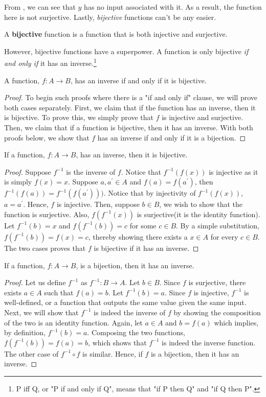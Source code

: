 From , we can see that \(y\) has no input associated with it. As a result, the function here is not surjective. Lastly, \emph{bijective} functions can't be any easier.
\begin{definition}
  A \textbf{bijective} function is a function that is both injective and surjective. 
\end{definition}


However, bijective functions have a superpower. A function is only bijective \textit{if and only if} it has an inverse.\footnote{P iff Q, or "P if and only if Q", means that "if P then Q" and "if Q then P".}
\begin{theorem}
  A function, \(f:A \to B\), has an inverse if and only if it is bijective.
\end{theorem}
\begin{proof}
  To begin such proofs where there is a "if and only if" clause, we will prove both cases separately. First, we claim that if the function has an inverse, then it is bijective. To prove this, we simply prove that \(f\) is injective and surjective. Then, we claim that if a function is bijective, then it has an inverse. With both proofs below, we show that \(f\) has an inverse if and only if it is a bijection.
\end{proof}
\begin{lemma}
  If a function, \(f: A \to B\), has an inverse, then it is bijective. 
  \label{inversebiject}
\end{lemma}
\begin{proof}
  Suppose \(f^{-1}\) is the inverse of \(f\). Notice that \(f^{-1}(f(x))\) is injective as it is simply \(f(x)=x\). Suppose \(a, a^\prime \in A\) and \(f(a)=f(a^\prime)\), then \(f^{-1}(f(a))=f^{-1}(f(a^\prime)))\). Notice that by injectivity of \(f^{-1}(f(x))\), \(a=a^\prime\). Hence, \(f\) is injective. Then, suppose \(b \in B\), we wish to show that the function is surjective. Also, \(f(f^{-1}(x))\) is surjective(it is the identity function). Let \(f^{-1}(b)=x\) and \(f(f^{-1}(b))=c\) for some \(c \in B\). By a simple substitution, \(f(f^{-1}(b))=f(x)=c\), thereby showing there exists a \(x \in A\) for every \(c \in B\). The two cases proves that \(f\) is bijective if it has an inverse.
\end{proof}
\begin{lemma}
  If a function, \(f: A \to B\), is a bijection, then it has an inverse.
  \label{bijectinverse}
\end{lemma}
\begin{proof}
  Let us define \(f^{-1}\) as \(f^{-1}: B \to A\). Let \(b \in B\). Since \(f\) is surjective, there exists \(a \in A\) such that \(f(a)=b\). Let \(f^{-1}(b)=a\). Since \(f\) is injective, \(f^{-1}\) is well-defined, or a function that outputs the same value given the same input. Next, we will show that \(f^{-1}\) is indeed the inverse of \(f\) by showing the composition of the two is an identity function. Again, let \(a \in A\) and \(b=f(a)\) which implies, by definition, \(f^{-1}(b)=a\). Composing the two functions, \(f(f^{-1}(b))=f(a)=b\), which shows that \(f^{-1}\) is indeed the inverse function. The other case of \(f^{-1} \circ f\) is similar. Hence, if \(f\) is a bijection, then it has an inverse.
\end{proof}
